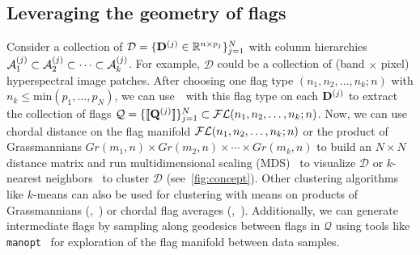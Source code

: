 




\subsection{Leveraging the geometry of flags}
Consider a collection of $\mathcal{D} = \{\mathbf{D}^{(j)} \in \mathbb{R}^{n \times p_j}\}_{j=1}^N$ with column hierarchies $\mathcal{A}_1^{(j)} \subset \mathcal{A}_2^{(j)} \subset \cdots \subset \mathcal{A}_k^{(j)}$. 
For example, $\mathcal{D}$ could be a collection of (band  $\times$ pixel) hyperspectral image patches. After choosing one flag type $(n_1,n_2,\dots,n_k;n)$ with $n_k \leq \mathrm{min}(p_1,\dots,p_N)$, we can use~\algname~with this flag type on each $\mathbf{D}^{(j)}$ to extract the collection of flags $ \mathcal{Q} = \{[\![\mathbf{Q}^{(j)}]\!]\}_{j=1}^N \subset \mathcal{FL}(n_1,n_2,\dots,n_k;n)$. Now, we can use chordal distance on the flag manifold $\mathcal{FL}(n_1,n_2,\dots,n_k;n)$ or the product of Grassmannians $Gr(m_1,n) \times Gr(m_2,n) \times \cdots \times Gr(m_k,n)$ to build an $N \times N$ distance matrix and run multidimensional scaling (MDS)~\cite{kruskal1978multidimensional} to visualize $\mathcal{D}$ or $k$-nearest neighbors~\cite{marrinan2021minimum} to cluster $\mathcal{D}$ (see~\cref{fig:concept}). Other clustering algorithms like $k$-means can also be used for clustering with means on products of Grassmannians (\eg,~\cite{fletcher2009geometric, draper2014flag, mankovich2022flag, mankovich2023subspace}) or chordal flag averages (\eg,~\cite{Mankovich_2023_ICCV}). Additionally, we can generate intermediate flags by sampling along geodesics between flags in $\mathcal{Q}$ using tools like {\tt manopt}~\cite{boumal2014manopt,townsend2016pymanopt} for exploration of the flag manifold between data samples.

